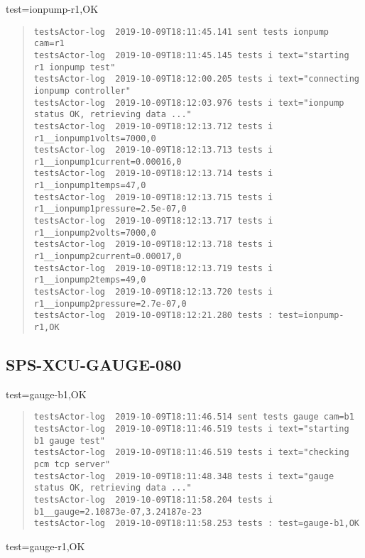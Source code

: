 \noindent test=ionpump-r1,OK

\begin{quote}
\begin{tiny}
\begin{verbatim}
testsActor-log  2019-10-09T18:11:45.141 sent tests ionpump cam=r1
testsActor-log  2019-10-09T18:11:45.145 tests i text="starting r1 ionpump test"
testsActor-log  2019-10-09T18:12:00.205 tests i text="connecting ionpump controller"
testsActor-log  2019-10-09T18:12:03.976 tests i text="ionpump status OK, retrieving data ..."
testsActor-log  2019-10-09T18:12:13.712 tests i r1__ionpump1volts=7000,0
testsActor-log  2019-10-09T18:12:13.713 tests i r1__ionpump1current=0.00016,0
testsActor-log  2019-10-09T18:12:13.714 tests i r1__ionpump1temps=47,0
testsActor-log  2019-10-09T18:12:13.715 tests i r1__ionpump1pressure=2.5e-07,0
testsActor-log  2019-10-09T18:12:13.717 tests i r1__ionpump2volts=7000,0
testsActor-log  2019-10-09T18:12:13.718 tests i r1__ionpump2current=0.00017,0
testsActor-log  2019-10-09T18:12:13.719 tests i r1__ionpump2temps=49,0
testsActor-log  2019-10-09T18:12:13.720 tests i r1__ionpump2pressure=2.7e-07,0
testsActor-log  2019-10-09T18:12:21.280 tests : test=ionpump-r1,OK
\end{verbatim}
\end{tiny}
\end{quote}

\subsection{SPS-XCU-GAUGE-080}
\label{sec:tc-080}

test=gauge-b1,OK

\begin{quote}
\begin{tiny}
\begin{verbatim}
testsActor-log  2019-10-09T18:11:46.514 sent tests gauge cam=b1
testsActor-log  2019-10-09T18:11:46.519 tests i text="starting b1 gauge test"
testsActor-log  2019-10-09T18:11:46.519 tests i text="checking pcm tcp server"
testsActor-log  2019-10-09T18:11:48.348 tests i text="gauge status OK, retrieving data ..."
testsActor-log  2019-10-09T18:11:58.204 tests i b1__gauge=2.10873e-07,3.24187e-23
testsActor-log  2019-10-09T18:11:58.253 tests : test=gauge-b1,OK
\end{verbatim}
\end{tiny}
\end{quote}

\noindent test=gauge-r1,OK

